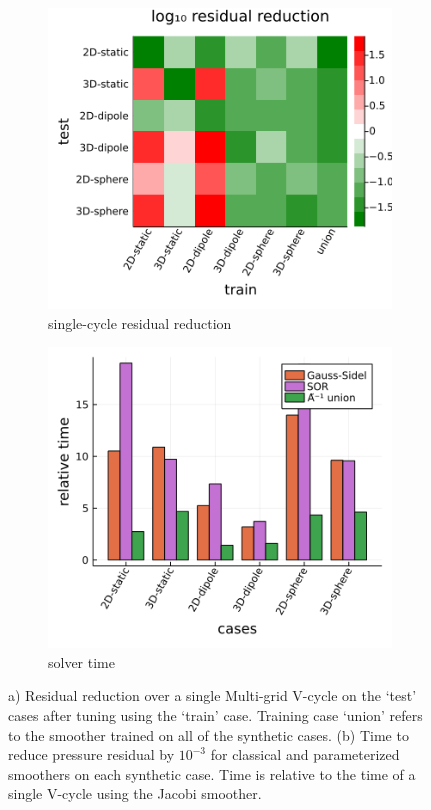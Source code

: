 \documentclass[review]{elsarticle}
\begin{document}
\begin{figure}
    \centering
    \begin{subfigure}[b]{0.47\textwidth}
        \centering
        \includegraphics[width=\textwidth]{figures/crossloss.png}
        \caption{single-cycle residual reduction}
        \label{fig:cross plot}
    \end{subfigure}
    \hfill
    \begin{subfigure}[b]{0.47\textwidth}
        \centering
        \includegraphics[width=\textwidth]{figures/synthetic_timing.png}
        \caption{solver time}
        \label{fig:synthetic time}
    \end{subfigure}
    \caption{a) Residual reduction over a single Multi-grid V-cycle on the `test' cases after tuning using the `train' case. Training case `union' refers to the smoother trained on all of the synthetic cases. (b) Time to reduce pressure residual by $10^{-3}$ for classical and parameterized smoothers on each synthetic case. Time is relative to the time of a single V-cycle using the Jacobi smoother.}
    \label{fig:synthetic results}
\end{figure}
\end{document}
